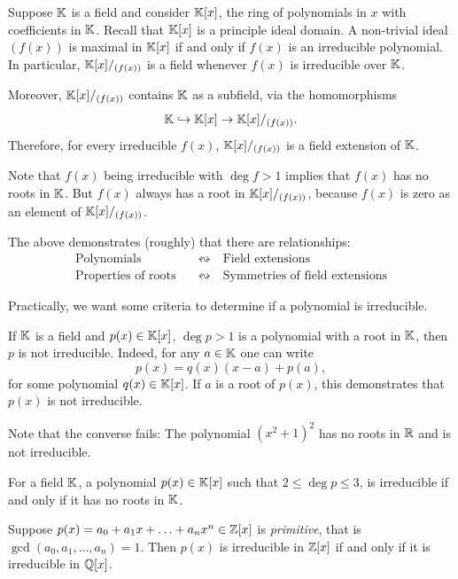 \begin{remark}
    Suppose $\mathbb{K}$ is a field and consider $\mathbb{K}[x]$, the ring of polynomials in $x$ with coefficients in $\mathbb{K}$. Recall that $\mathbb{K}[x]$ is a principle ideal domain. A non-trivial ideal $(f(x))$ is maximal in $\mathbb{K}[x]$ if and only if $f(x)$ is an irreducible polynomial. In particular, $\mathbb{K}[x]/_{(f(x))}$ is a field whenever $f(x)$ is irreducible over $\mathbb{K}$.

    Moreover, $\mathbb{K}[x]/_{(f(x))}$ contains $\mathbb{K}$ as a subfield, via the homomorphisms
    \[
        \mathbb{K} \hookrightarrow \mathbb{K}[x] \to \mathbb{K}[x]/_{(f(x))}.
    \]
    Therefore, for every irreducible $f(x)$, $\mathbb{K}[x]/_{(f(x))}$ is a field extension of $\mathbb{K}$.

    Note that $f(x)$ being irreducible with $\deg f > 1$ implies that $f(x)$ has no roots in $\mathbb{K}$. But $f(x)$ always has a root in $\mathbb{K}[x]/_{(f(x))}$, because $f(x)$ is zero as an element of $\mathbb{K}[x]/_{(f(x))}$.
\end{remark}

The above demonstrates (roughly) that there are relationships:
\begin{align*}
    \textrm{Polynomials} \quad &\leftrightsquigarrow \quad \textrm{Field extensions} \\
    \textrm{Properties of roots} \quad &\leftrightsquigarrow \quad \textrm{Symmetries of field extensions}
\end{align*}

Practically, we want some criteria to determine if a polynomial is irreducible.

\begin{remark}
    If $\mathbb{K}$ is a field and $p(x) \in \mathbb{K}[x]$, $\deg p > 1$ is a polynomial with a root in $\mathbb{K}$, then $p$ is not irreducible. Indeed, for any $a \in \mathbb{K}$ one can write
    \[
        p(x) = q(x) (x-a) + p(a),
    \]
    for some polynomial $q(x) \in \mathbb{K}[x]$. If $a$ is a root of $p(x)$, this demonstrates that $p(x)$ is not irreducible.

    Note that the converse fails: The polynomial $(x^2 + 1)^2$ has no roots in $\mathbb{R}$ and is not irreducible.
\end{remark}

\begin{lemma}
    For a field $\mathbb{K}$, a polynomial $p(x) \in \mathbb{K}[x]$ such that $2 \leq \deg p \leq 3$, is irreducible if and only if it has no roots in $\mathbb{K}$.
\end{lemma}

\begin{lemma}[Gauss]
    Suppose $p(x) = a_0 + a_1 x + \ldots + a_n x^n \in \mathbb{Z}[x]$ is \emph{primitive}, that is $\gcd(a_0, a_1, \ldots, a_n) = 1$. Then $p(x)$ is irreducible in $\mathbb{Z}[x]$ if and only if it is irreducible in $\mathbb{Q}[x]$.
\end{lemma}

